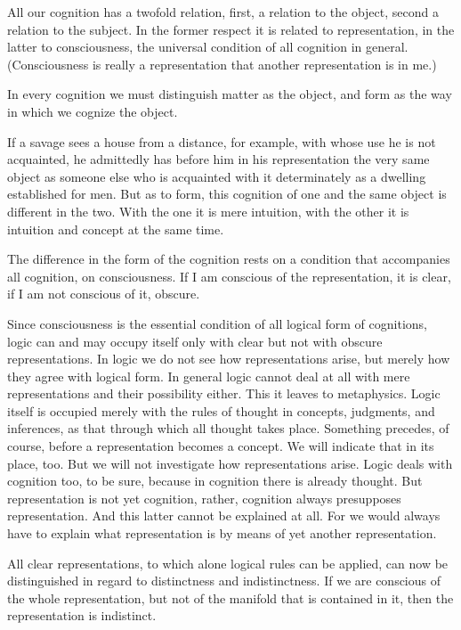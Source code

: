 All our cognition has a twofold relation,
first, a relation to the object,
second a relation to the subject.
In the former respect it is related to representation,
in the latter to consciousness,
the universal condition of all cognition in general.
(Consciousness is really a representation
that another representation is in me.)

In every cognition we must distinguish matter as the object,
and form as the way in which we cognize the object.

    If a savage sees a house from a distance, for example,
    with whose use he is not acquainted,
    he admittedly has before him in his representation
    the very same object as someone else
    who is acquainted with it determinately
    as a dwelling established for men.
    But as to form, this cognition of one and the same object
    is different in the two.
    With the one it is mere intuition,
    with the other it is intuition and concept at the same time.

The difference in the form of the cognition rests on
a condition that accompanies all cognition, on consciousness.
If I am conscious of the representation, it is clear,
if I am not conscious of it, obscure.

    Since consciousness is the essential condition
    of all logical form of cognitions,
    logic can and may occupy itself only with clear
    but not with obscure representations.
    In logic we do not see how representations arise,
    but merely how they agree with logical form.
    In general logic cannot deal at all
    with mere representations
    and their possibility either.
    This it leaves to metaphysics.
    Logic itself is occupied merely
    with the rules of thought in
    concepts, judgments, and inferences,
    as that through which all thought takes place.
    Something precedes, of course,
    before a representation becomes a concept.
    We will indicate that in its place, too.
    But we will not investigate how representations arise.
    Logic deals with cognition too, to be sure,
    because in cognition there is already thought.
    But representation is not yet cognition, rather,
    cognition always presupposes representation.
    And this latter cannot be explained at all.
    For we would always have to
    explain what representation is
    by means of yet another representation.

All clear representations,
to which alone logical rules can be applied,
can now be distinguished in regard to
distinctness and indistinctness.
If we are conscious of the whole representation,
but not of the manifold that is contained in it,
then the representation is indistinct.

